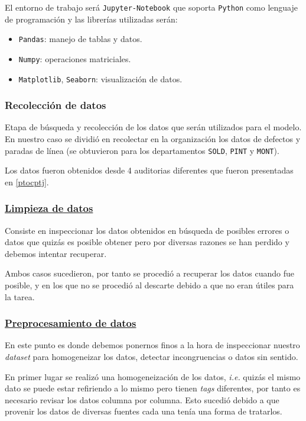\documentclass[a4paper,12pt]{article}
\begin{document}
El entorno de trabajo será \texttt{Jupyter-Notebook} que soporta \texttt{Python} como lenguaje de programación y las librerías utilizadas serán: 
\begin{itemize}
	\item \texttt{Pandas}: manejo de tablas y datos.
	\item \texttt{Numpy}: operaciones matriciales.
	\item \texttt{Matplotlib}, \texttt{Seaborn}: visualización de datos.
\end{itemize}

\subsubsection{Recolección de datos}

Etapa de búsqueda y recolección de los datos que serán utilizados para el modelo. En nuestro caso se dividió en recolectar en la organización los datos de defectos y paradas de línea (se obtuvieron para los departamentos \texttt{SOLD}, \texttt{PINT} y \texttt{MONT}).

Los datos fueron obtenidos desde 4 auditorias diferentes que fueron presentadas en \ref{ptocptj}.

\subsubsection{\href{https://github.com/GeraCollante/tesis-icomp-machinelearning/blob/main/DataCleaning.ipynb}{\color{blue}Limpieza de datos}}
Consiste en inspeccionar los datos obtenidos en búsqueda de posibles errores o datos que quizás es posible obtener pero por diversas razones se han perdido y debemos intentar recuperar.

Ambos casos sucedieron, por tanto se procedió a recuperar los datos cuando fue posible, y en los que no se procedió al descarte debido a que no eran útiles para la tarea.

\subsubsection{\href{https://github.com/GeraCollante/tesis-icomp-machinelearning/blob/main/DataPreproccesing.ipynb}{\color{blue}Preprocesamiento de datos}}
En este punto es donde debemos ponernos finos a la hora de inspeccionar nuestro \textit{dataset} para homogeneizar los datos, detectar incongruencias o datos sin sentido.

En primer lugar se realizó una homogeneización de los datos, \textit{i.e.} quizás el mismo dato se puede estar refiriendo a lo mismo pero tienen \textit{tags} diferentes, por tanto es necesario revisar los datos columna por columna. Esto sucedió debido a que provenir los datos de diversas fuentes cada una tenía una forma de tratarlos. 
\end{document}
